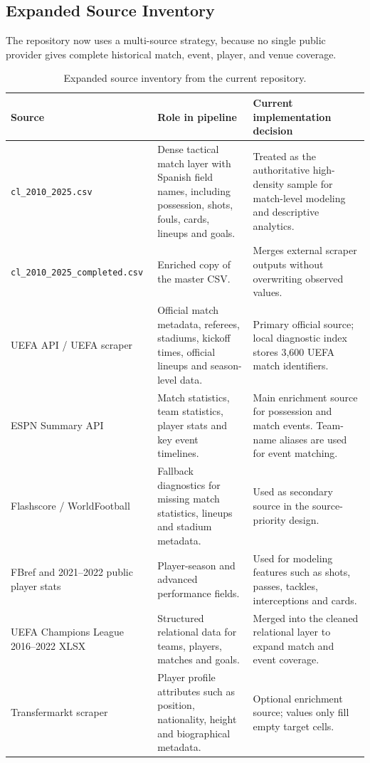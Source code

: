 \documentclass[12pt,a4paper]{article}
\begin{document}
\subsection{Expanded Source Inventory}
The repository now uses a multi-source strategy, because no single public provider gives complete historical match, event, player, and venue coverage.

\begin{table}[H]
\centering
\small
\begin{tabular}{p{3.2cm}p{5.2cm}p{5.1cm}}
\toprule
\textbf{Source} & \textbf{Role in pipeline} & \textbf{Current implementation decision} \\
\midrule
\texttt{cl\_2010\_2025.csv} & Dense tactical match layer with Spanish field names, including possession, shots, fouls, cards, lineups and goals. & Treated as the authoritative high-density sample for match-level modeling and descriptive analytics. \\
\texttt{cl\_2010\_2025\_completed.csv} & Enriched copy of the master CSV. & Merges external scraper outputs without overwriting observed values. \\
UEFA API / UEFA scraper & Official match metadata, referees, stadiums, kickoff times, official lineups and season-level data. & Primary official source; local diagnostic index stores 3,600 UEFA match identifiers. \\
ESPN Summary API & Match statistics, team statistics, player stats and key event timelines. & Main enrichment source for possession and match events. Team-name aliases are used for event matching. \\
Flashscore / WorldFootball & Fallback diagnostics for missing match statistics, lineups and stadium metadata. & Used as secondary source in the source-priority design. \\
FBref and 2021--2022 public player stats & Player-season and advanced performance fields. & Used for modeling features such as shots, passes, tackles, interceptions and cards. \\
UEFA Champions League 2016--2022 XLSX & Structured relational data for teams, players, matches and goals. & Merged into the cleaned relational layer to expand match and event coverage. \\
Transfermarkt scraper & Player profile attributes such as position, nationality, height and biographical metadata. & Optional enrichment source; values only fill empty target cells. \\
\bottomrule
\end{tabular}
\caption{Expanded source inventory from the current repository.}
\end{table}
\end{document}
